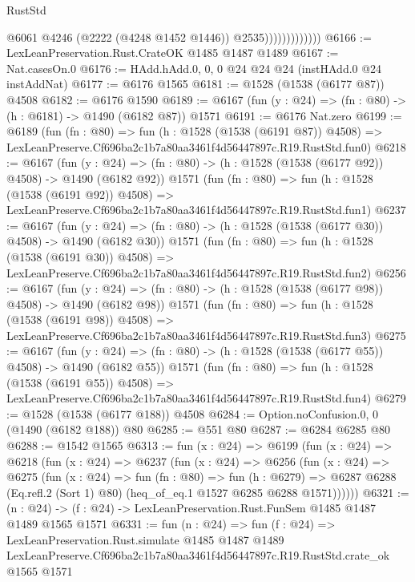 \begin{lexlean}{RustStd}
\begin{coremodule}
                              @6061
                              @4246
                              (@2222 (@4248 @1452 @1446))
                              @2535)))))))))))))
@6166 := LexLeanPreservation.Rust.CrateOK @1485 @1487 @1489
@6167 := Nat.casesOn.{0}
@6176 := HAdd.hAdd.{0, 0, 0} @24 @24 @24 (instHAdd.{0} @24 instAddNat)
@6177 := @6176 @1565
@6181 := @1528 (@1538 (@6177 @87)) @4508
@6182 := @6176 @1590
@6189 := @6167 (fun (y : @24) => (fn : @80) -> (h : @6181) -> @1490 (@6182 @87)) @1571
@6191 := @6176 Nat.zero
@6199 := @6189
    (fun (fn : @80) =>
    fun (h : @1528 (@1538 (@6191 @87)) @4508) =>
    LexLeanPreserve.Cf696ba2c1b7a80aa3461f4d56447897c.R19.RustStd.fun0)
@6218 := @6167
    (fun (y : @24) => (fn : @80) -> (h : @1528 (@1538 (@6177 @92)) @4508) -> @1490 (@6182 @92))
    @1571
    (fun (fn : @80) =>
    fun (h : @1528 (@1538 (@6191 @92)) @4508) =>
    LexLeanPreserve.Cf696ba2c1b7a80aa3461f4d56447897c.R19.RustStd.fun1)
@6237 := @6167
    (fun (y : @24) => (fn : @80) -> (h : @1528 (@1538 (@6177 @30)) @4508) -> @1490 (@6182 @30))
    @1571
    (fun (fn : @80) =>
    fun (h : @1528 (@1538 (@6191 @30)) @4508) =>
    LexLeanPreserve.Cf696ba2c1b7a80aa3461f4d56447897c.R19.RustStd.fun2)
@6256 := @6167
    (fun (y : @24) => (fn : @80) -> (h : @1528 (@1538 (@6177 @98)) @4508) -> @1490 (@6182 @98))
    @1571
    (fun (fn : @80) =>
    fun (h : @1528 (@1538 (@6191 @98)) @4508) =>
    LexLeanPreserve.Cf696ba2c1b7a80aa3461f4d56447897c.R19.RustStd.fun3)
@6275 := @6167
    (fun (y : @24) => (fn : @80) -> (h : @1528 (@1538 (@6177 @55)) @4508) -> @1490 (@6182 @55))
    @1571
    (fun (fn : @80) =>
    fun (h : @1528 (@1538 (@6191 @55)) @4508) =>
    LexLeanPreserve.Cf696ba2c1b7a80aa3461f4d56447897c.R19.RustStd.fun4)
@6279 := @1528 (@1538 (@6177 @188)) @4508
@6284 := Option.noConfusion.{0, 0} (@1490 (@6182 @188)) @80
@6285 := @551 @80
@6287 := @6284 @6285 @80
@6288 := @1542 @1565
@6313 := fun (x : @24) =>
  @6199
    (fun (x : @24) =>
    @6218
      (fun (x : @24) =>
      @6237
        (fun (x : @24) =>
        @6256
          (fun (x : @24) =>
          @6275
            (fun (x : @24) =>
            fun (fn : @80) =>
            fun (h : @6279) =>
            @6287 @6288 (Eq.refl.{2} (Sort 1) @80) (heq_of_eq.{1} @1527 @6285 @6288 @1571))))))
@6321 := (n : @24) -> (f : @24) -> LexLeanPreservation.Rust.FunSem @1485 @1487 @1489 @1565 @1571
@6331 := fun (n : @24) =>
  fun (f : @24) =>
  LexLeanPreservation.Rust.simulate
    @1485
    @1487
    @1489
    LexLeanPreserve.Cf696ba2c1b7a80aa3461f4d56447897c.R19.RustStd.crate_ok
    @1565
    @1571
\end{coremodule}
\end{lexlean}
